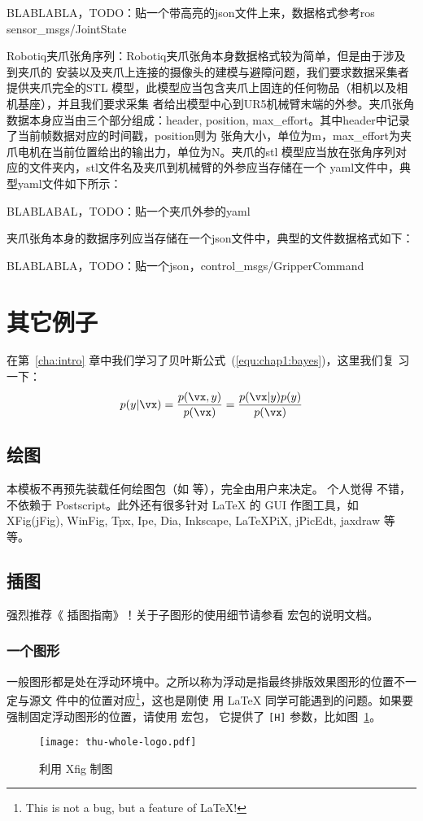   BLABLABLA，TODO：贴一个带高亮的json文件上来，数据格式参考ros sensor_msgs/JointState

  Robotiq夹爪张角序列：Robotiq夹爪张角本身数据格式较为简单，但是由于涉及到夹爪的
  安装以及夹爪上连接的摄像头的建模与避障问题，我们要求数据采集者提供夹爪完全的STL
  模型，此模型应当包含夹爪上固连的任何物品（相机以及相机基座），并且我们要求采集
  者给出模型中心到UR5机械臂末端的外参。夹爪张角数据本身应当由三个部分组成：header,
  position, max_effort。其中header中记录了当前帧数据对应的时间戳，position则为
  张角大小，单位为m，max_effort为夹爪电机在当前位置给出的输出力，单位为N。夹爪的stl
  模型应当放在张角序列对应的文件夹内，stl文件名及夹爪到机械臂的外参应当存储在一个
  yaml文件中，典型yaml文件如下所示：

  BLABLABAL，TODO：贴一个夹爪外参的yaml

  夹爪张角本身的数据序列应当存储在一个json文件中，典型的文件数据格式如下：

  BLABLABLA，TODO：贴一个json，control_msgs/GripperCommand


\section{其它例子}
\label{sec:other}

在第~\ref{cha:intro} 章中我们学习了贝叶斯公式~(\ref{equ:chap1:bayes})，这里我们复
习一下：
\begin{equation}
\label{equ:chap2:bayes}
p(y|\vx) = \frac{p(\vx,y)}{p(\vx)}=
\frac{p(\vx|y)p(y)}{p(\vx)}
\end{equation}

\subsection{绘图}
\label{sec:draw}

本模板不再预先装载任何绘图包（如  等），完全由用户来决定。
个人觉得  不错，不依赖于 Postscript。此外还有很多针对 \LaTeX{} 的
 GUI 作图工具，如 XFig(jFig), WinFig, Tpx, Ipe, Dia, Inkscape, LaTeXPiX,
jPicEdt, jaxdraw 等等。

\subsection{插图}
\label{sec:graphs}

强烈推荐《\LaTeXe{} 插图指南》！关于子图形的使用细节请参看  宏包的说明文档。

\subsubsection{一个图形}
\label{sec:onefig}
一般图形都是处在浮动环境中。之所以称为浮动是指最终排版效果图形的位置不一定与源文
件中的位置对应\footnote{This is not a bug, but a feature of \LaTeX!}，这也是刚使
用 \LaTeX{} 同学可能遇到的问题。如果要强制固定浮动图形的位置，请使用  宏包，
它提供了 \texttt{[H]} 参数，比如图~\ref{fig:xfig1}。
\begin{figure}[H] %
  \centering
  \texttt{[image: thu-whole-logo.pdf]}
  \caption{利用 Xfig 制图}
  \label{fig:xfig1}
\end{figure}

